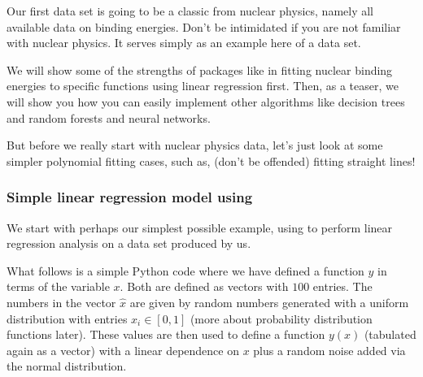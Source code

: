 \documentclass[letterpaper,10pt,english]{sphinxmanual}
\begin{document}
Our first data set is going to be a classic from nuclear physics, namely all
available data on binding energies. Don’t be intimidated if you are not familiar with nuclear physics. It serves simply as an example here of a data set.

We will show some of the
strengths of packages like  in fitting nuclear binding energies to
specific functions using linear regression first. Then, as a teaser, we will show you how
you can easily implement other algorithms like decision trees and random forests and neural networks.

But before we really start with nuclear physics data, let’s just look at some simpler polynomial fitting cases, such as,
(don’t be offended) fitting straight lines!


\subsubsection{Simple linear regression model using }
\label{\detokenize{chapter2:simple-linear-regression-model-using-scikit-learn}}
We start with perhaps our simplest possible example, using  to perform linear regression analysis on a data set produced by us.

What follows is a simple Python code where we have defined a function
\(y\) in terms of the variable \(x\). Both are defined as vectors with  \(100\) entries.
The numbers in the vector \(\hat{x}\) are given
by random numbers generated with a uniform distribution with entries
\(x_i \in [0,1]\) (more about probability distribution functions
later). These values are then used to define a function \(y(x)\)
(tabulated again as a vector) with a linear dependence on \(x\) plus a
random noise added via the normal distribution.
\end{document}
